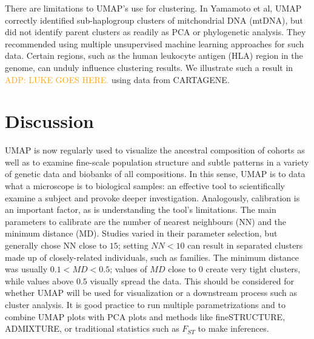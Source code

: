 \documentclass[12pt]{article}
\newcommand{\adpcomment}[1]{{\textcolor{orange}{ADP: #1}}}
\begin{document}
There are limitations to UMAP's use for clustering. In Yamamoto et al, UMAP correctly identified sub-haplogroup clusters of mitchondrial DNA (mtDNA), but did not identify parent clusters as readily as PCA or phylogenetic analysis. They recommended using multiple unsupervised machine learning approaches for such data\cite{yamamoto_genetic_2020}. Certain regions, such as the human leukocyte antigen (HLA) region in the genome, can unduly influence clustering results. We illustrate such a result in \adpcomment{LUKE GOES HERE.} using data from CARTAGENE.


\section*{Discussion}


UMAP is now regularly used to visualize the ancestral composition of cohorts as well as to examine fine-scale population structure and subtle patterns in a variety of genetic data and biobanks of all compositions. In this sense, UMAP is to data what a microscope is to biological samples: an effective tool to scientifically examine a subject and provoke deeper investigation. Analogously, calibration is an important factor, as is understanding the tool's limitations. The main parameters to calibrate are the number of nearest neighbours (NN) and the minimum distance (MD). Studies varied in their parameter selection, but generally chose NN close to $15$; setting $NN < 10$ can result in separated clusters made up of closely-related individuals, such as families. The minimum distance was usually $0.1 < MD < 0.5$; values of $MD$ close to $0$ create very tight clusters, while values above $0.5$ visually spread the data. This should be considered for whether UMAP will be used for visualization or a downstream process such as cluster analysis. It is good practice to run multiple parametrizations and to combine UMAP plots with PCA plots and methods like fineSTRUCTURE\cite{lawson2012inference}, ADMIXTURE\cite{alexander2009fast}, or traditional statistics such as $F_{ST}$ to make inferences.
\end{document}

